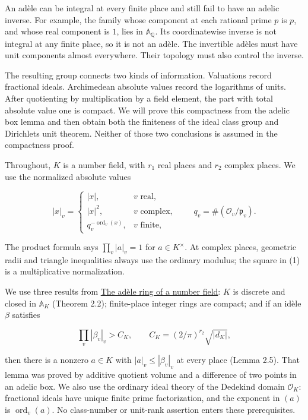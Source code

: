 \documentclass[
  english,
  11pt,
  a4paper,
]{article}
\begin{document}
An adèle can be integral at every finite place and still fail to have an
adelic inverse. For example, the family whose component at each rational
prime \(p\) is \(p\), and whose real component is \(1\), lies in
\(\mathbb A_{\mathbb Q}\). Its coordinatewise inverse is not integral at
any finite place, so it is not an adèle. The invertible adèles must have
unit components almost everywhere. Their topology must also control the
inverse.

The resulting group connects two kinds of information. Valuations record
fractional ideals. Archimedean absolute values record the logarithms of
units. After quotienting by multiplication by a field element, the part
with total absolute value one is compact. We will prove this compactness
from the adelic box lemma and then obtain both the finiteness of the
ideal class group and Dirichlet\textquotesingle s unit theorem. Neither
of those two conclusions is assumed in the compactness proof.

Throughout, \(K\) is a number field, with \(r_1\) real places and
\(r_2\) complex places. We use the normalized absolute values

\[|x|_v=\begin{cases}
|x|,&v\text{ real},\\
|x|^2,&v\text{ complex},\\
q_v^{-\operatorname{ord}_v(x)},&v\text{ finite},
\end{cases}
\qquad q_v=\#(\mathcal O_v/\mathfrak p_v).
\tag{1}\]

The product formula says \(\prod_v|a|_v=1\) for \(a\in K^\times\). At
complex places, geometric radii and triangle inequalities always use the
ordinary modulus; the square in (1) is a multiplicative normalization.

We use three results from \hyperref[NT-ADL-02]{The adèle ring of a
number field}: \(K\) is discrete and closed in \(\mathbb A_K\) (Theorem
2.2); finite-place integer rings are compact; and if an idèle \(\beta\)
satisfies

\[\prod_v|\beta_v|_v>C_K,
\qquad C_K=(2/\pi)^{r_2}\sqrt{|d_K|},
\tag{2}\]

then there is a nonzero \(a\in K\) with \(|a|_v\leq |\beta_v|_v\) at
every place (Lemma 2.5). That lemma was proved by additive quotient
volume and a difference of two points in an adelic box. We also use the
ordinary ideal theory of the Dedekind domain \(\mathcal O_K\):
fractional ideals have unique finite prime factorization, and the
exponent in \((a)\) is \(\operatorname{ord}_v(a)\). No class-number or
unit-rank assertion enters these prerequisites.
\end{document}

